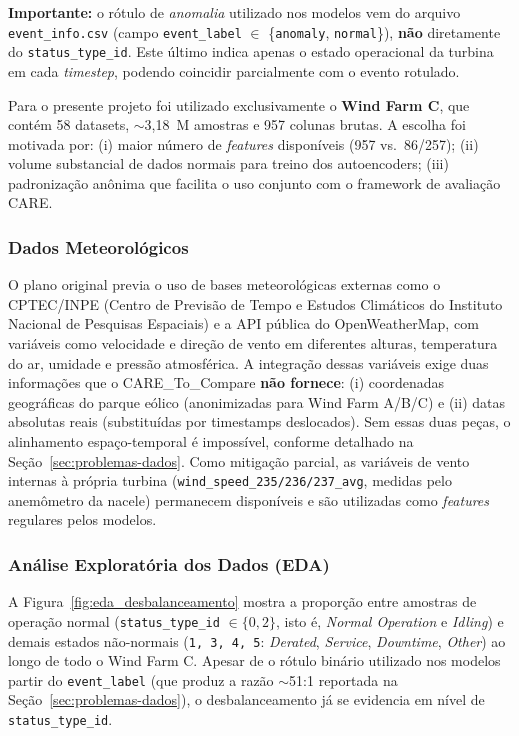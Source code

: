 \documentclass[12pt]{article}
\begin{document}
\textbf{Importante:} o rótulo de \emph{anomalia} utilizado nos modelos vem do arquivo \texttt{event\_info.csv} (campo \texttt{event\_label} $\in$ \{\texttt{anomaly}, \texttt{normal}\}), \textbf{não} diretamente do \texttt{status\_type\_id}. Este último indica apenas o estado operacional da turbina em cada \textit{timestep}, podendo coincidir parcialmente com o evento rotulado.

Para o presente projeto foi utilizado exclusivamente o \textbf{Wind Farm C}, que contém 58 datasets, $\sim$3,18~M amostras e 957 colunas brutas. A escolha foi motivada por: (i) maior número de \textit{features} disponíveis (957 vs.\ 86/257); (ii) volume substancial de dados normais para treino dos autoencoders; (iii) padronização anônima que facilita o uso conjunto com o framework de avaliação CARE.

\subsubsection{Dados Meteorológicos}

O plano original previa o uso de bases meteorológicas externas como o CPTEC/INPE (Centro de Previsão de Tempo e Estudos Climáticos do Instituto Nacional de Pesquisas Espaciais) e a API pública do OpenWeatherMap, com variáveis como velocidade e direção de vento em diferentes alturas, temperatura do ar, umidade e pressão atmosférica. A integração dessas variáveis exige duas informações que o CARE\_To\_Compare \textbf{não fornece}: (i) coordenadas geográficas do parque eólico (anonimizadas para Wind Farm A/B/C) e (ii) datas absolutas reais (substituídas por timestamps deslocados). Sem essas duas peças, o alinhamento espaço-temporal é impossível, conforme detalhado na Seção~\ref{sec:problemas-dados}. Como mitigação parcial, as variáveis de vento internas à própria turbina (\texttt{wind\_speed\_235/236/237\_avg}, medidas pelo anemômetro da nacele) permanecem disponíveis e são utilizadas como \textit{features} regulares pelos modelos.

\subsubsection{Análise Exploratória dos Dados (EDA)}

A Figura~\ref{fig:eda_desbalanceamento} mostra a proporção entre amostras de operação normal (\texttt{status\_type\_id} $\in \{0, 2\}$, isto é, \emph{Normal Operation} e \emph{Idling}) e demais estados não-normais (\texttt{1, 3, 4, 5}: \emph{Derated}, \emph{Service}, \emph{Downtime}, \emph{Other}) ao longo de todo o Wind Farm C. Apesar de o rótulo binário utilizado nos modelos partir do \texttt{event\_label} (que produz a razão $\sim$51:1 reportada na Seção~\ref{sec:problemas-dados}), o desbalanceamento já se evidencia em nível de \texttt{status\_type\_id}.
\end{document}
